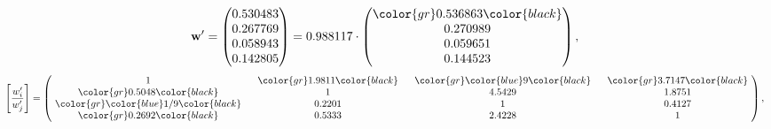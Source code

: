 \begin{example}
\begin{equation*}
\mathbf{w}^{\prime} =
\begin{pmatrix}
0.530483\\
0.267769\\
0.058943\\
0.142805
\end{pmatrix} =
0.988117\cdot
\begin{pmatrix}
\color{gr} 0.536863\color{black} \\
0.270989\\
0.059651\\
0.144523
\end{pmatrix},
\end{equation*}
\begin{equation*}
\left[ \frac{{w}^{\prime}_i}{{w}^{\prime}_j} \right] =
\begin{pmatrix}
$\,\,$ 1 $\,\,$ & $\,\,$\color{gr} 1.9811\color{black} $\,\,$ & $\,\,$\color{gr} \color{blue} 9\color{black} $\,\,$ & $\,\,$\color{gr} 3.7147\color{black} $\,\,$ \\
$\,\,$\color{gr} 0.5048\color{black} $\,\,$ & $\,\,$ 1 $\,\,$ & $\,\,$4.5429$\,\,$ & $\,\,$1.8751  $\,\,$ \\
$\,\,$\color{gr} \color{blue}  1/9\color{black} $\,\,$ & $\,\,$0.2201$\,\,$ & $\,\,$ 1 $\,\,$ & $\,\,$0.4127 $\,\,$ \\
$\,\,$\color{gr} 0.2692\color{black} $\,\,$ & $\,\,$0.5333$\,\,$ & $\,\,$2.4228$\,\,$ & $\,\,$ 1  $\,\,$ \\
\end{pmatrix},
\end{equation*}
\end{example}
\newpage

